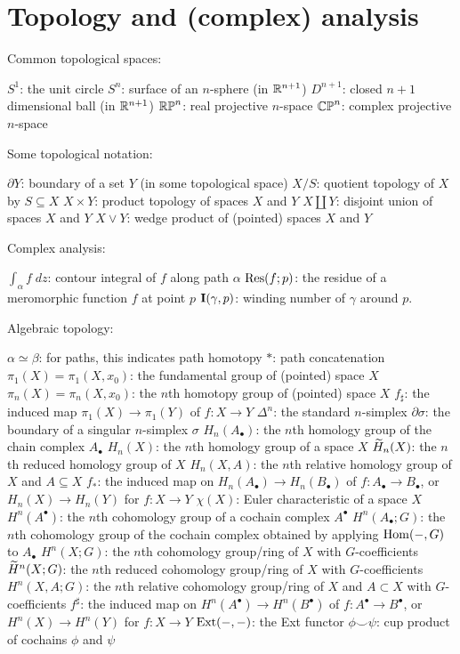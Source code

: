 \section{Topology and (complex) analysis}
Common topological spaces:
\begin{itemize}
	\ii $S^1$: the unit circle
	\ii $S^n$: surface of an $n$-sphere (in $\mathbb R^{n+1}$)
	\ii $D^{n+1}$: closed $n+1$ dimensional ball (in $\mathbb R^{n+1}$)
	\ii $\mathbb{RP}^n$: real projective $n$-space
	\ii $\mathbb{CP}^n$: complex projective $n$-space
\end{itemize}
Some topological notation:
\begin{itemize}
	\ii $\partial Y$: boundary of a set $Y$ (in some topological space)
	\ii $X/S$: quotient topology of $X$ by $S \subseteq X$
	\ii $X \times Y$: product topology of spaces $X$ and $Y$
	\ii $X \amalg Y$: disjoint union of spaces $X$ and $Y$
	\ii $X \vee Y$: wedge product of (pointed) spaces $X$ and $Y$
\end{itemize}
Complex analysis:
\begin{itemize}
	\ii $\int_\alpha f \; dz$: contour integral of $f$ along path $\alpha$
	\ii $\operatorname{Res}(f;p)$: the residue of a meromorphic function $f$ at point $p$
	\ii $\operatorname{\mathbf I}(\gamma, p)$: winding number of $\gamma$ around $p$.
\end{itemize}
Algebraic topology:
\begin{itemize}
	\ii $\alpha \simeq \beta$: for paths, this indicates path homotopy
	\ii $\ast$: path concatenation
	\ii $\pi_1(X) = \pi_1(X, x_0)$: the fundamental group of (pointed) space $X$
	\ii $\pi_n(X) = \pi_n(X, x_0)$: the $n$th homotopy group of (pointed) space $X$
	\ii $f_\sharp$: the induced map $\pi_1(X) \to \pi_1(Y)$ of $f : X \to Y$
	\ii $\Delta^n$: the standard $n$-simplex
	\ii $\partial\sigma$: the boundary of a singular $n$-simplex $\sigma$
	\ii $H_n(A_\bullet)$: the $n$th homology group of the chain complex $A_\bullet$
	\ii $H_n(X)$: the $n$th homology group of a space $X$
	\ii $\widetilde H_n(X)$: the $n$th reduced homology group of $X$
	\ii $H_n(X, A)$: the $n$th relative homology group of $X$ and $A \subseteq X$
	\ii $f_\ast$: the induced map on $H_n(A_\bullet) \to H_n(B_\bullet)$
	of $f : A_\bullet \to B_\bullet$,
	or $H_n(X) \to H_n(Y)$ for $f : X \to Y$
	\ii $\chi(X)$: Euler characteristic of a space $X$
	\ii $H^n(A^\bullet)$: the $n$th cohomology group of a cochain complex $A^\bullet$
	\ii $H^n(A_\bullet; G)$: the $n$th cohomology group of the cochain complex
	obtained by applying $\operatorname{Hom}(-,G)$ to $A_\bullet$
	\ii $H^n(X; G)$: the $n$th cohomology group/ring of $X$ with $G$-coefficients
	\ii $\widetilde H^n(X; G)$: the $n$th reduced cohomology group/ring of $X$ with $G$-coefficients
	\ii $H^n(X,A ; G)$: the $n$th relative cohomology group/ring of $X$ and $A \subset X$ with $G$-coefficients
	\ii $f^\sharp$: the induced map on $H^n(A^\bullet) \to H^n(B^\bullet)$
	of $f : A^\bullet \to B^\bullet$,
	or $H^n(X) \to H^n(Y)$ for $f : X \to Y$
	\ii $\operatorname{Ext}(-,-)$: the Ext functor
	\ii $\phi \smile \psi$: cup product of cochains $\phi$ and $\psi$
\end{itemize}

